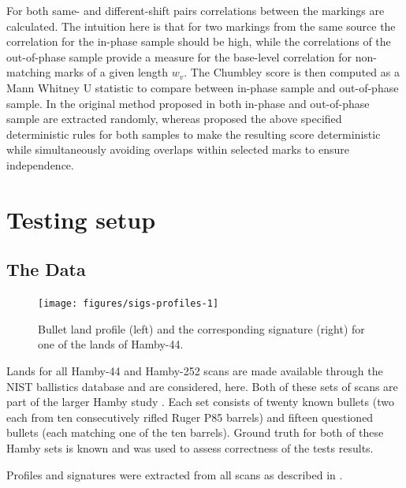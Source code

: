 \documentclass[12pt]{article}
\begin{document}
For both same- and different-shift pairs correlations between the
markings are calculated. The intuition here is that for two markings
from the same source the correlation for the in-phase sample should be
high, while the correlations of the out-of-phase sample provide a
measure for the base-level correlation for non-matching marks of a given
length \(w_v\). The Chumbley score is then computed as a Mann Whitney U
statistic to compare between in-phase sample and out-of-phase sample. In
the original method proposed in \citet{chumbley} both in-phase and
out-of-phase sample are extracted randomly, whereas \citet{hadler}
proposed the above specified deterministic rules for both samples to
make the resulting score deterministic while simultaneously avoiding
overlaps within selected marks to ensure independence.

\section{Testing setup}\label{testing-setup}

\subsection{The Data}\label{the-data}


\begin{figure}

{\centering \texttt{[image: figures/sigs-profiles-1]} 

}

\caption{Bullet land profile (left) and the corresponding signature (right) for one of the lands of Hamby-44.}\label{fig:sigs-profiles}
\end{figure}

Lands for all Hamby-44 and Hamby-252 scans are made available through
the NIST ballistics database \citep{nist} and are considered, here. Both
of these sets of scans are part of the larger Hamby study \citep{hamby}.
Each set consists of twenty known bullets (two each from ten
consecutively rifled Ruger P85 barrels) and fifteen questioned bullets
(each matching one of the ten barrels). Ground truth for both of these
Hamby sets is known and was used to assess correctness of the tests
results.


Profiles and signatures were extracted from all scans as described in
\citet{aoas}.
\end{document}
